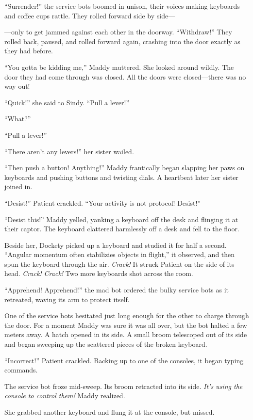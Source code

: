 \documentclass[10pt]{article}
\begin{document}
``Surrender!'' the service bots boomed in unison, their voices making
keyboards and coffee cups rattle. They rolled forward side by side---

---only to get jammed against each other in the doorway. ``Withdraw!''
They rolled back, paused, and rolled forward again, crashing into the
door exactly as they had before.

``You gotta be kidding me,'' Maddy muttered. She looked around wildly.
The door they had come through was closed. All the doors were
closed---there was no way out!

``Quick!'' she said to Sindy. ``Pull a lever!''

``What?''

``Pull a lever!''

``There aren't any levers!'' her sister wailed.

``Then push a button! Anything!'' Maddy frantically began slapping her
paws on keyboards and pushing buttons and twisting dials. A heartbeat
later her sister joined in.

``Desist!'' Patient crackled. ``Your activity is not protocol! Desist!''

``Desist this!'' Maddy yelled, yanking a keyboard off the desk and
flinging it at their captor. The keyboard clattered harmlessly off a
desk and fell to the floor.

Beside her, Dockety picked up a keyboard and studied it for half a
second. ``Angular momentum often stabilizies objects in flight,'' it
observed, and then spun the keyboard through the air. \emph{Crack!} It
struck Patient on the side of its head. \emph{Crack!} \emph{Crack!} Two
more keyboards shot across the room.

``Apprehend! Apprehend!'' the mad bot ordered the bulky service bots as
it retreated, waving its arm to protect itself.

One of the service bots hesitated just long enough for the other to
charge through the door. For a moment Maddy was sure it was all over,
but the bot halted a few meters away. A hatch opened in its side. A
small broom telescoped out of its side and began sweeping up the
scattered pieces of the broken keyboard.

``Incorrect!'' Patient crackled. Backing up to one of the consoles, it
began typing commands.

The service bot froze mid-sweep. Its broom retracted into its side.
\emph{It's using the console to control them!} Maddy realized.

She grabbed another keyboard and flung it at the console, but missed.
\end{document}
